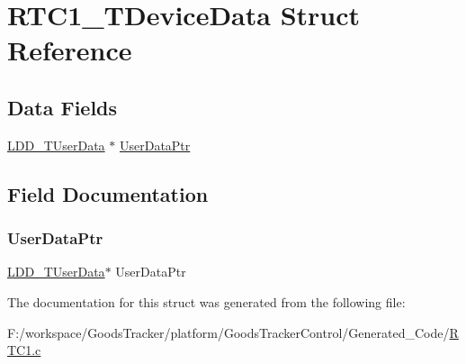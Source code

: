 \hypertarget{struct_r_t_c1___t_device_data}{}\section{R\+T\+C1\+\_\+\+T\+Device\+Data Struct Reference}
\label{struct_r_t_c1___t_device_data}
\subsection*{Data Fields}
\begin{DoxyCompactItemize}
\item 
\hyperlink{group___p_e___types__module_ga0b66a73f87238a782318aa0be7578e35}{L\+D\+D\+\_\+\+T\+User\+Data} $\ast$ \hyperlink{struct_r_t_c1___t_device_data_a8e77b9d030b00c231823350a904e0f83}{User\+Data\+Ptr}
\end{DoxyCompactItemize}


\subsection{Field Documentation}
\mbox{\label{struct_r_t_c1___t_device_data_a8e77b9d030b00c231823350a904e0f83}} 
\subsubsection{\texorpdfstring{User\+Data\+Ptr}{UserDataPtr}}
{\footnotesize\ttfamily \hyperlink{group___p_e___types__module_ga0b66a73f87238a782318aa0be7578e35}{L\+D\+D\+\_\+\+T\+User\+Data}$\ast$ User\+Data\+Ptr}



The documentation for this struct was generated from the following file\+:\begin{DoxyCompactItemize}
\item 
F\+:/workspace/\+Goods\+Tracker/platform/\+Goods\+Tracker\+Control/\+Generated\+\_\+\+Code/\hyperlink{_r_t_c1_8c}{R\+T\+C1.\+c}\end{DoxyCompactItemize}
